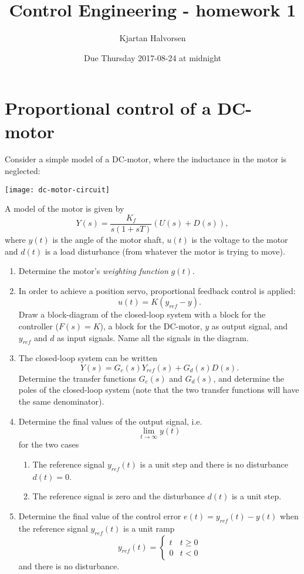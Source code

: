 \documentclass[a4paper]{scrartcl}
\author{Kjartan Halvorsen}
\date{Due Thursday 2017-08-24 at midnight}
\title{Control Engineering - homework 1}
\begin{document}
\maketitle

\section*{Proportional control of a DC-motor}
\label{sec-1}

Consider a simple model of a DC-motor, where the inductance in the motor is neglected:
\begin{center}
\texttt{[image: dc-motor-circuit]}
\end{center}
A model of the motor is given by
\[ Y(s) = \frac{K_f}{s(1+sT)} \left( U(s) + D(s)\right), \]
where $y(t)$ is the angle of the motor shaft, $u(t)$ is the voltage to the motor and $d(t)$ is a load disturbance (from whatever the motor is trying to move).

\begin{enumerate}
\item Determine the motor's \emph{weighting function} $g(t)$.
\item In order to achieve a position servo, proportional feedback control is applied: \[ u(t) = K(y_{ref} - y). \] Draw a block-diagram of the closed-loop system with a block for the controller ($F(s)=K$), a block for the DC-motor, $y$ as output signal, and $y_{ref}$ and $d$ as input signals. Name all the signals in the diagram.
\item The closed-loop system can be written
\[ Y(s) = G_c(s) Y_{ref}(s) + G_d(s) D(s). \]
Determine the transfer functions $G_c(s)$ and $G_d(s)$, and determine the poles of the closed-loop system (note that the two transfer functions will have the same denominator).
\item Determine the final values of the output signal, i.e.
\[ \lim_{t \to \infty} y(t) \]
for the two cases
\begin{enumerate}
\item The reference signal $y_{ref}(t)$ is a unit step and there is no disturbance $d(t)=0$.
\item The reference signal is zero and the disturbance $d(t)$ is a unit step.
\end{enumerate}
\item Determine the final value of the control error \(e(t) = y_{ref}(t) - y(t)\) when the reference signal $y_{ref}(t)$ is a unit ramp
\[ y_{ref}(t) = \begin{cases} t & t\ge 0\\ 0 & t<0 \end{cases} \]
and there is no disturbance.
\end{enumerate}
\end{document}
